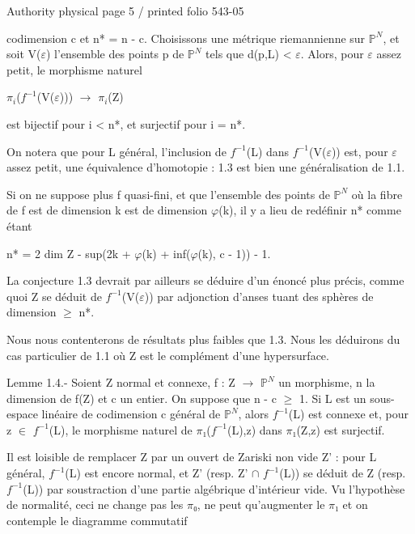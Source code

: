 \documentclass[10pt,a4paper]{article}
\begin{document}
\noindent\begin{adjustbox}{max totalsize={\textwidth}{0.945\textheight},center}
\begin{minipage}{\textwidth}
\noindent\hfill\scriptsize Authority physical page 5 / printed folio 543-05\par\normalsize
\noindent codimension c et n* = n - c. Choisissons une métrique riemannienne sur \ensuremath{ℙ^N}, et soit V(\ensuremath{ε}) l'ensemble des points p de \ensuremath{ℙ^N} tels que d(p,L) < \ensuremath{ε}. Alors, pour \ensuremath{ε} assez petit, le morphisme naturel\par\smallskip
\noindent \ensuremath{π_i}(\ensuremath{f^{-1}}(V(\ensuremath{ε}))) \ensuremath{→} \ensuremath{π_i}(Z)\par\smallskip
\noindent est bijectif pour i < n*, et surjectif pour i = n*.\par\smallskip
\noindent On notera que pour L général, l'inclusion de \ensuremath{f^{-1}}(L) dans \ensuremath{f^{-1}}(V(\ensuremath{ε})) est, pour \ensuremath{ε} assez petit, une équivalence d'homotopie : 1.3 est bien une généralisation de 1.1.\par\smallskip
\noindent Si on ne suppose plus f quasi-fini, et que l'ensemble des points de \ensuremath{ℙ^N} où la fibre de f est de dimension k est de dimension \ensuremath{φ}(k), il y a lieu de redéfinir n* comme étant\par\smallskip
\noindent n* = 2 dim Z - sup(2k + \ensuremath{φ}(k) + inf(\ensuremath{φ}(k), c - 1)) - 1.\par\smallskip
\noindent La conjecture 1.3 devrait par ailleurs se déduire d'un énoncé plus précis, comme quoi Z se déduit de \ensuremath{f^{-1}}(V(\ensuremath{ε})) par adjonction d'anses tuant des sphères de dimension \ensuremath{≥} n*.\par\smallskip
\noindent Nous nous contenterons de résultats plus faibles que 1.3. Nous les déduirons du cas particulier de 1.1 où Z est le complément d'une hypersurface.\par\smallskip
\noindent Lemme 1.4.- Soient Z normal et connexe, f : Z \ensuremath{→} \ensuremath{ℙ^N} un morphisme, n la dimension de f(Z) et c un entier. On suppose que n - c \ensuremath{≥} 1. Si L est un sous-espace linéaire de codimension c général de \ensuremath{ℙ^N}, alors \ensuremath{f^{-1}}(L) est connexe et, pour z \ensuremath{∈} \ensuremath{f^{-1}}(L), le morphisme naturel de \ensuremath{π₁}(\ensuremath{f^{-1}}(L),z) dans \ensuremath{π₁}(Z,z) est surjectif.\par\smallskip
\noindent Il est loisible de remplacer Z par un ouvert de Zariski non vide Z' : pour L général, \ensuremath{f^{-1}}(L) est encore normal, et Z' (resp. Z' \ensuremath{∩} \ensuremath{f^{-1}}(L)) se déduit de Z (resp. \ensuremath{f^{-1}}(L)) par soustraction d'une partie algébrique d'intérieur vide. Vu l'hypothèse de normalité, ceci ne change pas les \ensuremath{π₀}, ne peut qu'augmenter le \ensuremath{π₁} et on contemple le diagramme commutatif\par\smallskip

\end{minipage}
\end{adjustbox}
\end{document}
